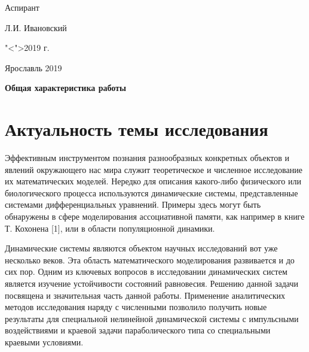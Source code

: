 \documentclass[12pt]{extarticle}
\begin{document}
\vspace{0.5cm}
	
\hspace{16em} Аспирант\par
\hspace{16em} \underline{\hspace{4.3cm}}Л.И. Ивановский \par
\hspace{16em} "<\underline{\hspace{0.9cm}}">\underline{\hspace{4.9cm}}2019 г.\par
	
\vspace{1.5cm}
	
\begin{center}
	Ярославль 2019
\end{center}
	
\newpage

\begin{center}
{\Large \textbf{Общая характеристика работы}}
\end{center}

\hspace{0cm}

\hspace{0cm}

\hspace{0cm}

\section*{Актуальность темы исследования}

\hspace{0cm}

\hspace{0cm}

\hspace{0cm}

Эффективным инструментом познания разнообразных конкретных объектов и явлений окружающего нас мира служит теоретическое и численное исследование их математических моделей. Нередко для описания какого-либо физического или биологического процесса используются динамические системы, представленные системами дифференциальных уравнений. Примеры здесь могут быть обнаружены в сфере моделирования ассоциативной памяти, как например в книге Т. Кохонена [1], или в области популяционной динамики. 

Динамические системы являются объектом научных исследований вот уже несколько веков. Эта область математического моделирования развивается и до сих пор. Одним из ключевых вопросов в исследовании динамических систем является изучение устойчивости состояний равновесия. Решению данной задачи посвящена и значительная часть данной работы. Применение аналитических методов исследования наряду с численными позволило получить новые результаты для специальной нелинейной динамической системы с импульсными воздействиями и краевой задачи параболического типа со специальными краевыми условиями.
\end{document}
